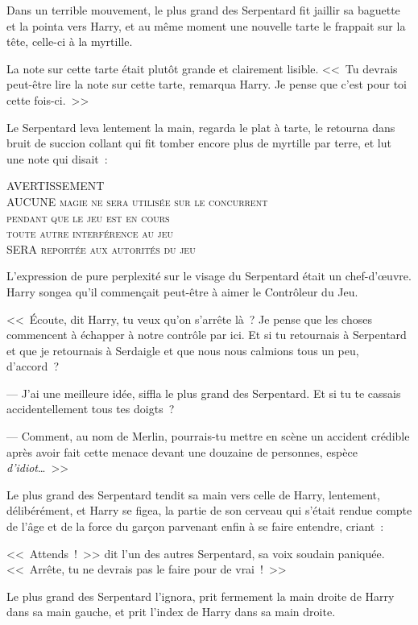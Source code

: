 Dans un terrible mouvement, le plus grand des Serpentard fit jaillir sa baguette et la pointa vers Harry, et au même moment une nouvelle tarte le frappait sur la tête, celle-ci à la myrtille.

La note sur cette tarte était plutôt grande et clairement lisible. <<~Tu devrais peut-être lire la note sur cette tarte, remarqua Harry. Je pense que c'est pour toi cette fois-ci.~>>

Le Serpentard leva lentement la main, regarda le plat à tarte, le retourna dans bruit de succion collant qui fit tomber encore plus de myrtille par terre, et lut une note qui disait~: \begin{center} \scshape \MakeUppercase{Avertissement}\\ \MakeUppercase{Aucune} magie ne sera utilisée sur le concurrent\\ pendant que le jeu est en cours\\ toute autre interférence au jeu\\ \MakeUppercase{sera} reportée aux autorités du jeu\end{center}

L'expression de pure perplexité sur le visage du Serpentard était un chef-d'œuvre. Harry songea qu'il commençait peut-être à aimer le Contrôleur du Jeu.

<<~Écoute, dit Harry, tu veux qu'on s'arrête là~? Je pense que les choses commencent à échapper à notre contrôle par ici. Et si tu retournais à Serpentard et que je retournais à Serdaigle et que nous nous calmions tous un peu, d'accord~?

--- J'ai une meilleure idée, siffla le plus grand des Serpentard. Et si tu te cassais accidentellement tous tes doigts~?

--- Comment, au nom de Merlin, pourrais-tu mettre en scène un accident crédible après avoir fait cette menace devant une douzaine de personnes, espèce \emph{d'idiot}…~>>

Le plus grand des Serpentard tendit sa main vers celle de Harry, lentement, délibérément, et Harry se figea, la partie de son cerveau qui s'était rendue compte de l'âge et de la force du garçon parvenant enfin à se faire entendre, criant~: 

<<~Attends~!~>> dit l'un des autres Serpentard, sa voix soudain paniquée. <<~Arrête, tu ne devrais pas le faire pour de vrai~!~>>

Le plus grand des Serpentard l'ignora, prit fermement la main droite de Harry dans sa main gauche, et prit l'index de Harry dans sa main droite.

